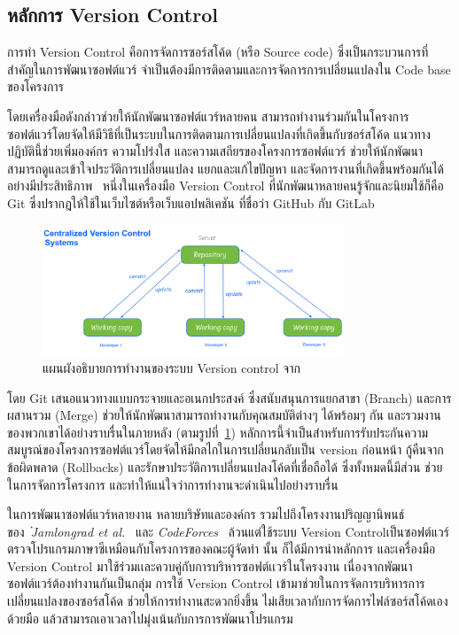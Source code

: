 \documentclass[12pt,one side,openright,a4paper]{cpe-thesis-th}
\newcommand{\thaijustify}[1]{%
  \par\hspace{30pt}\justifying
  #1
}
\begin{document}
    \subsection{หลักการ Version Control}
        \thaijustify{
            การทำ Version Control คือการจัดการซอร์สโค้ด (หรือ Source code) ซึ่งเป็นกระบวนการที่สำคัญในการพัฒนาซอฟต์แวร์ จำเป็นต้องมีการติดตามและการจัดการการเปลี่ยนแปลงใน Code base ของโครงการ~\cite{nattawat20pgs, rawat22versionctl}
        }
        \thaijustify{
            โดยเครื่องมือดังกล่าวช่วยให้นักพัฒนาซอฟต์แวร์หลายคน สามารถทำงานร่วมกันในโครงการซอฟต์แวร์โดยจัดให้มีวิธีที่เป็นระบบในการติดตามการเปลี่ยนแปลงที่เกิดขึ้นกับซอร์สโค้ด แนวทางปฏิบัตินี้ช่วยเพิ่มองค์กร ความโปร่งใส และความเสถียรของโครงการซอฟต์แวร์ ช่วยให้นักพัฒนาสามารถดูและเข้าใจประวัติการเปลี่ยนแปลง แยกและแก้ไขปัญหา และจัดการงานที่เกิดขึ้นพร้อมกันได้อย่างมีประสิทธิภาพ~\cite{rawat22versionctl} หนึ่งในเครื่องมือ Version Control ที่นักพัฒนาหลายคนรู้จักและนิยมใช้ก็คือ Git ซึ่งปรากฎให้ใช้ในเว็บไซต์หรือเว็บแอปพลิเคชัน ที่ชื่อว่า GitHub กับ GitLab~\cite{chacon14}
        }
        \begin{figure}[H]
            \centering
            \includegraphics[width=9cm]{figure/literature/version-control.png}
            \caption[แผนผังอธิบายการทำงานของระบบ Version control]{แผนผังอธิบายการทำงานของระบบ Version control จาก~\cite{rawat22versionctl}}
            \label{fig:version-control}
        \end{figure}
        \thaijustify{
            โดย Git เสนอแนวทางแบบกระจายและอเนกประสงค์ ซึ่งสนับสนุนการแยกสาขา (Branch) และการผสานรวม (Merge) ช่วยให้นักพัฒนาสามารถทำงานกับคุณสมบัติต่างๆ ได้พร้อมๆ กัน และรวมงานของพวกเขาได้อย่างราบรื่นในภายหลัง (ตามรูปที่~\ref{fig:version-control}) หลักการนี้จำเป็นสำหรับการรับประกันความสมบูรณ์ของโครงการซอฟต์แวร์โดยจัดให้มีกลไกในการเปลี่ยนกลับเป็น version ก่อนหน้า กู้คืนจากข้อผิดพลาด (Rollbacks) และรักษาประวัติการเปลี่ยนแปลงโค้ดที่เชื่อถือได้ ซึ่งทั้งหมดนี้มีส่วน ช่วยในการจัดการโครงการ และทำให้แน่ใจว่าการทำงานจะดำเนินไปอย่างราบรื่น
        }
        \thaijustify{
            ในการพัฒนาซอฟต์แวร์หลายงาน หลายบริษัทและองค์กร รวมไปถึงโครงงานปริญญานิพนธ์ของ~\textit{๋Jamlongrad et al.}~\cite{nattawat20pgs} และ \textit{CodeForces}~\cite{codeforces} ล้วนแต่ใช้ระบบ Version Controlเป็นซอฟต์แวร์ตรวจโปรแกรมภาษาซีเหมือนกับโครงการของคณะผู้จัดทำ นั้น ก็ได้มีการนำหลักการ และเครื่องมือ Version Control มาใช้ร่วมเเละควบคู่กับการบริหารซอฟต์เเวร์ในโครงงาน เนื่องจากพัฒนาซอฟต์แวร์ต้องทำงานกันเป็นกลุ่ม การใช้ Version Control เข้ามาช่วยในการจัดการบริหารการเปลี่ยนแปลงของซอร์สโค้ด ช่วยให้การทำงานสะดวกยิ่งขึ้น ไม่เสียเวลากับการจัดการไฟล์ซอร์สโค้ดเองด้วยมือ แล้วสามารถเอาเวลาไปมุ่งเน้นกับการการพัฒนาโปรแกรม
        }
\end{document}
